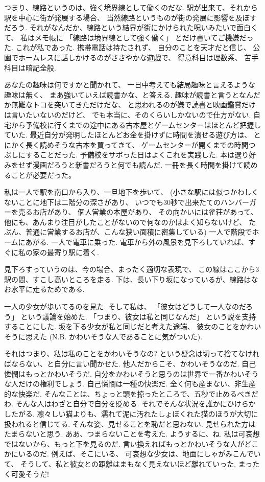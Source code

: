 
つまり、線路というのは、強く境界線として働くのだな.
駅が出来て、それから駅を中心に街が発展する場合、
当然線路というものが街の発展に影響を及ぼすだろう.
それがなんだか、線路という結界が街にかけられた呪いみたいで面白くて、
私はメモ帳に
「線路は境界線として強く働く」
とだけ書いてご機嫌だった.
これが私であった.
携帯電話は持たされず、
自分のことを天才だと信じ、
公園でホームレスに話しかけるのがささやかな遊戯で、
得意科目は理数系、
苦手科目は暗記全般.

あなたの趣味は何ですかと聞かれて、
一日中考えても結局趣味と言えるような趣味は無く、
まあ強いていえば読書かな、と答える.
趣味が読書と言うとなんだか無難なトコを突いてきただけだな、
と思われるのが嫌で読書と映画鑑賞だけは言いたいないのだけど、
でも本当に、そのくらいしかないので仕方がない.
自宅から予備校に行くまでの途中にある古本屋とゲームセンターはほとんど把握していた.
最近自分が発明したほとんどお金を掛けずに時間を潰せる遊び方は、
とにかく長く読めそうな古本を買ってきて、
ゲームセンターが開くまでの時間つぶしにすることだった.
予備校をサボった日はよくこれを実践した.
本は選り好みをせず漫画だろうと新書だろうと何でも読んだ.
一冊を長く時間を掛けて読めることが必要だった。

\hline

私は一人で駅を南口から入り、一旦地下を歩いて、
(小さな駅には似つかわしくないことに地下は二階分の深さがあり、
いつでも30秒で出来たてのハンバーガーを売るお店があり、
個人営業の本屋があり、
その向かいには雀荘があって、
他にも、あんまり注目がしたことがないので何なのかはよく知らないけど、
たぶん、普通に営業するお店が、こんな狭い面積に密集している)
一人で階段でホームにあがる.
一人で電車に乗った.
電車から外の風景を見下ろしていれば、すぐに私の家の最寄り駅に着く.

見下ろすっていうのは、今の場合、まったく適切な表現で、
この線はここから3駅の間、すこし高いところを走る.
下は、長い下り坂になっているが、線路はなお水平に走るためである.

一人の少女が歩いてるのを見た. そして私は、
「彼女はどうして一人なのだろう」 という議論を始めた.
「つまり、彼女は私と同じなんだ」 という説を支持することにした.
坂を下る少女が私と同じだと考えた途端、 彼女のことをかわいそうに思えた
(N.B. かわいそうな人であることに気がついた).

それはつまり、私は私のことをかわいそうなの?
という疑念は切って捨てなければならない、と自分に言い聞かせた.
他人だからこそ、かわいそうなのだ. 自己憐憫はもっとかわいそうだ.
自分をかわいそうと思うのは世界で一番かわいそうな人だけの権利でしょう.
自己憐憫は一種の快楽だ. 全く何も産まない、非生産的な快楽だ.
そんなことは、ちょっと頭を掠ったところで、五秒で止めるべきだわ.
そんな人はわざと自分で自分を貶める.
それでそんな状況を誰かにひけらかしたがる.
凛々しい猫よりも、濡れて泥に汚れたしょぼくれた猫のほうが大切に扱われると信じてる.
そんな姿、見せることを恥だと思わない. 見せられた方はたまらないと思う.
ああ、つまらないことを考えた. ようするに、ね.
私は可哀想ではないから、もっと下を見るのだ.
言い換えればもっとかわいそうな人がどこかにいるのだ.
例えば、そこにいる、 可哀想な少女は、地面にしゃがみこんでいて、
そうして、私と彼女との距離はまもなく見えないほど離れていった.
まったく可愛そうだ!

